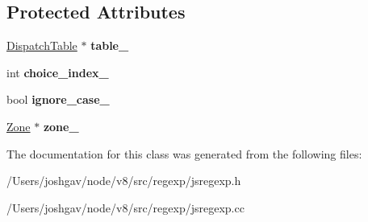 \subsection*{Protected Attributes}
\begin{DoxyCompactItemize}
\item 
\hyperlink{classv8_1_1internal_1_1_dispatch_table}{Dispatch\+Table} $\ast$ {\bfseries table\+\_\+}\hypertarget{classv8_1_1internal_1_1_dispatch_table_constructor_ac24136ab00d4fba0fc0077970832842d}{}\label{classv8_1_1internal_1_1_dispatch_table_constructor_ac24136ab00d4fba0fc0077970832842d}

\item 
int {\bfseries choice\+\_\+index\+\_\+}\hypertarget{classv8_1_1internal_1_1_dispatch_table_constructor_a5e4b4a8a541c0d4743049ad864812ec2}{}\label{classv8_1_1internal_1_1_dispatch_table_constructor_a5e4b4a8a541c0d4743049ad864812ec2}

\item 
bool {\bfseries ignore\+\_\+case\+\_\+}\hypertarget{classv8_1_1internal_1_1_dispatch_table_constructor_a5d2858b027b6417237daaaff21070656}{}\label{classv8_1_1internal_1_1_dispatch_table_constructor_a5d2858b027b6417237daaaff21070656}

\item 
\hyperlink{classv8_1_1internal_1_1_zone}{Zone} $\ast$ {\bfseries zone\+\_\+}\hypertarget{classv8_1_1internal_1_1_dispatch_table_constructor_aa66c09c6c54e03b653d344c2c172c396}{}\label{classv8_1_1internal_1_1_dispatch_table_constructor_aa66c09c6c54e03b653d344c2c172c396}

\end{DoxyCompactItemize}


The documentation for this class was generated from the following files\+:\begin{DoxyCompactItemize}
\item 
/\+Users/joshgav/node/v8/src/regexp/jsregexp.\+h\item 
/\+Users/joshgav/node/v8/src/regexp/jsregexp.\+cc\end{DoxyCompactItemize}
